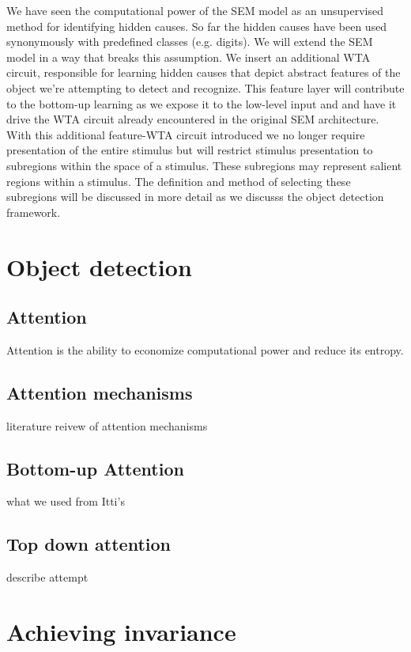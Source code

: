 \documentclass{report}
\begin{document}
We have seen the computational power of the SEM model as an unsupervised method for identifying hidden causes. So far the hidden causes have been used synonymously with predefined classes (e.g. digits\cite{LeCun1998}). We will extend the SEM model in a way that breaks this assumption. We insert an additional WTA circuit, responsible for learning hidden causes that depict abstract features of the object we're attempting to detect and recognize. This feature layer will contribute to the bottom-up learning as we expose it to the low-level input and and have it drive the WTA circuit already encountered in the original SEM architecture. With this additional feature-WTA circuit introduced we no longer require presentation of the entire stimulus but will restrict stimulus presentation to subregions within the space of a stimulus. These subregions may represent salient regions within a stimulus. The definition and method of selecting these subregions will be discussed in more detail as we discusss the object detection framework.

\chapter{Object detection}

\section{Attention}

Attention is the ability to economize computational power and reduce its entropy. 

\section{Attention mechanisms}

literature reivew of attention mechanisms

\section{Bottom-up Attention}

what we used from Itti's

\section{Top down attention}

describe attempt

\chapter{Achieving invariance}
\end{document}

